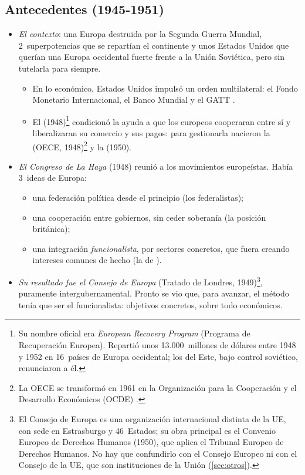 \documentclass[11pt]{article}
\begin{document}
\subsection{Antecedentes (1945-1951)}\label{sec:antecedentes}

\begin{itemize}
\item \emph{El contexto}: una Europa destruida por la Segunda Guerra Mundial, 2~superpotencias que se repartían el continente y unos Estados Unidos que querían una Europa occidental fuerte frente a la Unión Soviética, pero sin tutelarla para siempre.
  \begin{itemize}
  \item En lo económico, Estados Unidos impulsó un orden multilateral: el Fondo Monetario Internacional, el Banco Mundial y el GATT .
  \item El  (1948)\footnote{Su nombre oficial era \emph{European Recovery Program} (Programa de Recuperación Europea). Repartió unos 13.000~millones de dólares entre 1948 y 1952 en 16~países de Europa occidental; los del Este, bajo control soviético, renunciaron a él.} condicionó la ayuda a que los europeos cooperaran entre sí y liberalizaran su comercio y sus pagos: para gestionarla nacieron la  (OECE, 1948)\footnote{La OECE se transformó en 1961 en la Organización para la Cooperación y el Desarrollo Económicos (OCDE) .} y la  (1950).
  \end{itemize}
\item \emph{El Congreso de La Haya} (1948) reunió a los movimientos europeístas. Había 3~ideas de Europa:
  \begin{itemize}
  \item una federación política desde el principio (los federalistas);
  \item una cooperación entre gobiernos, sin ceder soberanía (la posición británica);
  \item una integración \emph{funcionalista}, por sectores concretos, que fuera creando intereses comunes de hecho (la de ).
  \end{itemize}
\item \emph{Su resultado fue el Consejo de Europa} (Tratado de Londres, 1949)\footnote{El Consejo de Europa es una organización internacional distinta de la UE, con sede en Estrasburgo y 46~Estados; su obra principal es el Convenio Europeo de Derechos Humanos (1950), que aplica el Tribunal Europeo de Derechos Humanos. No hay que confundirlo con el Consejo Europeo ni con el Consejo de la UE, que son instituciones de la Unión (\ref{sec:otros}).}, puramente intergubernamental. Pronto se vio que, para avanzar, el método tenía que ser el funcionalista: objetivos concretos, sobre todo económicos.
\end{itemize}
\end{document}

